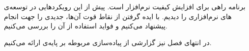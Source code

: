 
 برنامه راهی برای افزایش کیفیت نرم‌افزار است. پیش از این رویکردهایی در توسعه‌ی های نرم‌افزاری را دیدیم. با ایده گرفتن از نقاط قوت آن‌ها،   جدیدی را جهت انجام  پیشنهاد می‌کنیم و فواید استفاده از آن را بررسی می‌کنیم.

در انتهای فصل نیز گزارشی از پیاده‌سازی  مربوطه بر پایه‌ی  ارائه می‌کنیم.











